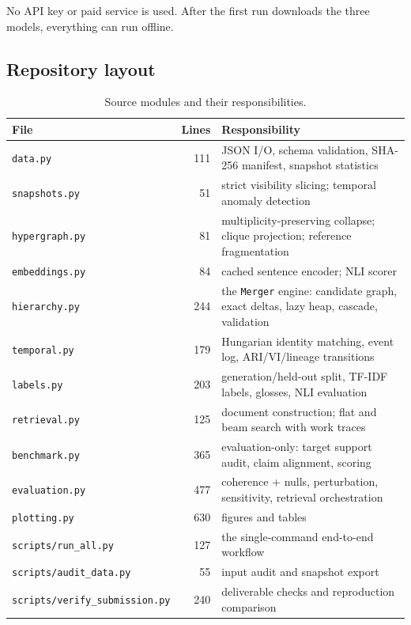 \documentclass[11pt,a4paper]{article}
\theoremstyle{remark}
\newcommand{\code}[1]{\texttt{\small #1}}
\begin{document}
No API key or paid service is used. After the first run downloads the three models,
everything can run offline.

\subsection{Repository layout}

\begin{table}[!htbp]
\centering
\caption{Source modules and their responsibilities.}
\label{tab:modules}
\begin{tabularx}{\linewidth}{lrX}
\toprule
File & Lines & Responsibility\\
\midrule
\code{data.py} & 111 & JSON I/O, schema validation, SHA-256 manifest, snapshot statistics\\
\code{snapshots.py} & 51 & strict visibility slicing; temporal anomaly detection\\
\code{hypergraph.py} & 81 & multiplicity-preserving collapse; clique projection; reference fragmentation\\
\code{embeddings.py} & 84 & cached sentence encoder; NLI scorer\\
\code{hierarchy.py} & 244 & the \code{Merger} engine: candidate graph, exact deltas, lazy heap, cascade, validation\\
\code{temporal.py} & 179 & Hungarian identity matching, event log, ARI/VI/lineage transitions\\
\code{labels.py} & 203 & generation/held-out split, TF-IDF labels, glosses, NLI evaluation\\
\code{retrieval.py} & 125 & document construction; flat and beam search with work traces\\
\code{benchmark.py} & 365 & evaluation-only: target support audit, claim alignment, scoring\\
\code{evaluation.py} & 477 & coherence + nulls, perturbation, sensitivity, retrieval orchestration\\
\code{plotting.py} & 630 & figures and tables\\
\midrule
\code{scripts/run\_all.py} & 127 & the single-command end-to-end workflow\\
\code{scripts/audit\_data.py} & 55 & input audit and snapshot export\\
\code{scripts/verify\_submission.py} & 240 & deliverable checks and reproduction comparison\\
\bottomrule
\end{tabularx}
\end{table}
\end{document}
